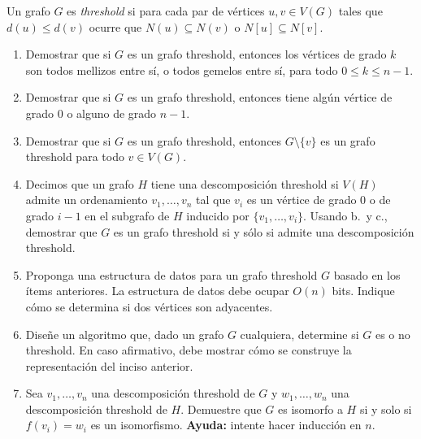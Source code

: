 

 \item Un grafo $G$ es \emph{threshold} si para cada par de vértices $u,v \in V(G)$ tales que $d(u) \leq d(v)$ ocurre que $N(u) \subseteq N(v)$ o $N[u] \subseteq N[v]$. 
 \begin{enumerate}[label=$\alph*)$,ref=$\alph*)$]
  \item Demostrar que si $G$ es un grafo threshold, entonces los vértices de grado $k$ son todos mellizos entre sí, o todos gemelos entre sí, para todo $0 \leq k \leq n-1$.
  \item Demostrar que si $G$ es un grafo threshold, entonces tiene algún vértice de grado $0$ o alguno de grado $n-1$.
  \item Demostrar que si $G$ es un grafo threshold, entonces $G \setminus \{v\}$ es un grafo threshold para todo $v \in V(G)$.
  \item Decimos que un grafo $H$ tiene una descomposición threshold si $V(H)$ admite un ordenamiento $v_1, \ldots, v_n$ tal que $v_i$ es un vértice de grado $0$ o de grado $i-1$ en el subgrafo de $H$ inducido por $\{v_1, \ldots, v_i\}$.  Usando b.\ y c., demostrar que $G$ es un grafo threshold si y sólo si admite una descomposición threshold.
  \item Proponga una estructura de datos para un grafo threshold $G$ basado en los ítems anteriores.  La estructura de datos debe ocupar $O(n)$ bits.  Indique cómo se determina si dos vértices son adyacentes.
  \item Diseñe un algoritmo que, dado un grafo $G$ cualquiera, determine si $G$ es o no threshold.  En caso afirmativo, debe mostrar cómo se construye la representación del inciso anterior.
  \item Sea $v_1, \ldots, v_n$ una descomposición threshold de $G$ y $w_1, \ldots, w_n$ una descomposición threshold de $H$.  Demuestre que $G$ es isomorfo a $H$ si y solo si $f(v_i) = w_i$ es un isomorfismo. \textbf{Ayuda:} intente hacer inducción en $n$.
 \end{enumerate}

